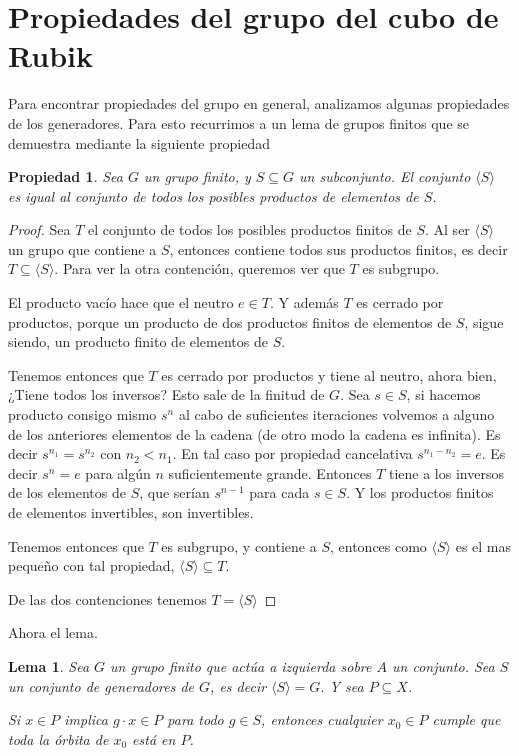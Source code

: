 \documentclass{article}
\newtheorem{lema}{Lema}[section]
\newtheorem{propiedad}{Propiedad}[section]
\theoremstyle{definition}
\begin{document}
\section{Propiedades del grupo del cubo de Rubik}
Para encontrar propiedades del grupo en general, analizamos algunas propiedades de los generadores. Para esto recurrimos a un lema de grupos finitos que se demuestra mediante la siguiente propiedad
\begin{propiedad}
    Sea $G$ un grupo finito, y $S\subseteq G$ un subconjunto. El conjunto $\langle S\rangle$ es igual al conjunto de todos los posibles productos de elementos de $S$.
\end{propiedad}
\begin{proof}
    Sea $T$ el conjunto de todos los posibles productos finitos de $S$. Al ser $\langle S\rangle$ un grupo que contiene a $S$, entonces contiene todos sus productos finitos, es decir $T\subseteq \langle S\rangle$. Para ver la otra contención, queremos ver que $T$ es subgrupo.

    El producto vacío hace que el neutro $e\in T$. Y además $T$ es cerrado por productos, porque un producto de dos productos finitos de elementos de $S$, sigue siendo, un producto finito de elementos de $S$.

    Tenemos entonces que $T$ es cerrado por productos y tiene al neutro, ahora bien, ¿Tiene todos los inversos? Esto sale de la finitud de $G$. Sea $s\in S$, si hacemos producto consigo mismo $s^n$ al cabo de suficientes iteraciones volvemos a alguno de los anteriores elementos de la cadena (de otro modo la cadena es infinita). Es decir $s^{n_1}=s^{n_2}$ con $n_2< n_1$. En tal caso por propiedad cancelativa $s^{n_1-n_2}=e$. Es decir $s^{n}=e$ para algún $n$ suficientemente grande. Entonces $T$ tiene a los inversos de los elementos de $S$, que serían $s^{n-1}$ para cada $s\in S$. Y los productos finitos de elementos invertibles, son invertibles.

    Tenemos entonces que $T$ es subgrupo, y contiene a $S$, entonces como $ \langle S\rangle$ es el mas pequeño con tal propiedad, $\langle S\rangle\subseteq T$.

    De las dos contenciones tenemos $T=\langle S\rangle$
\end{proof}
Ahora el lema.
\begin{lema}\label{lema:lema_de_grupos_finitos}
    Sea $G$ un grupo finito que actúa a izquierda sobre $A$ un conjunto. Sea $S$ un conjunto de generadores de $G$, es decir $\langle S\rangle=G$. Y sea $P\subseteq X$.

    Si $x\in P$ implica $g\cdot x\in P$ para todo $g\in S$, entonces cualquier $x_0\in P$ cumple que toda la órbita de $x_0$ está en $P$.
\end{lema}
\end{document}
